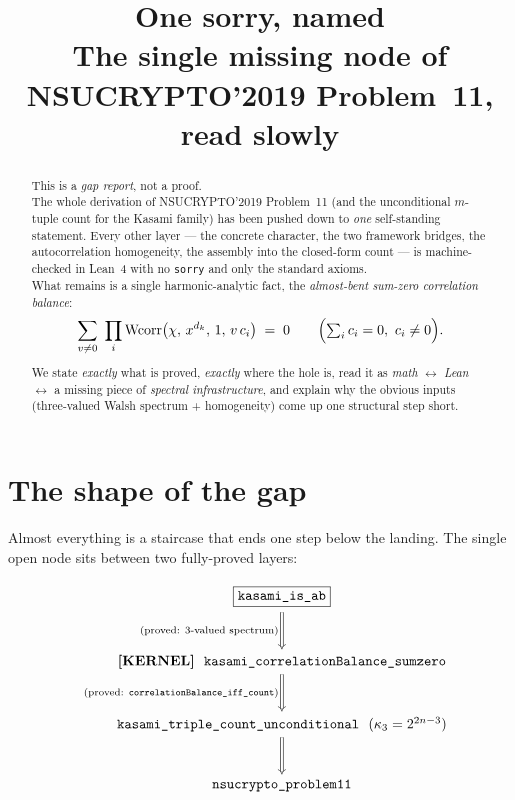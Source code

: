 \documentclass[11pt]{article}
\title{\textbf{One sorry, named}\\[4pt]
\large The single missing node of NSUCRYPTO'2019 Problem~11, read slowly}
\author{}
\date{}
\begin{document}
\maketitle

\begin{abstract}
\noindent
This is a \emph{gap report}, not a proof.\\[4pt]
The whole derivation of NSUCRYPTO'2019 Problem~11 (and the unconditional
$m$-tuple count for the Kasami family) has been pushed down to \emph{one}
self-standing statement.  Every other layer --- the concrete character, the
two framework bridges, the autocorrelation homogeneity, the assembly into the
closed-form count --- is machine-checked in Lean~4 with no \texttt{sorry} and
only the standard axioms.\\[6pt]
\noindent
What remains is a single harmonic-analytic fact, the
\emph{almost-bent sum-zero correlation balance}:
\[
  \sum_{v\neq 0}\ \prod_{i} \mathrm{Wcorr}\bigl(\chi,\, x^{d_k},\, 1,\, v\,c_i\bigr)
  \;=\; 0
  \qquad\Bigl(\textstyle\sum_i c_i = 0,\ c_i\neq 0\Bigr).
\]
\noindent
We state \emph{exactly} what is proved, \emph{exactly} where the hole is, read
it as \emph{math} $\leftrightarrow$ \emph{Lean} $\leftrightarrow$ a missing
piece of \emph{spectral infrastructure}, and explain why the obvious inputs
(three-valued Walsh spectrum + homogeneity) come up one structural step short.
\end{abstract}

\bigskip

\section*{The shape of the gap}

\noindent
Almost everything is a staircase that ends one step below the landing.
The single open node sits between two fully-proved layers:

\[
\begin{tikzcd}[row sep=large, column sep=small]
\boxed{\texttt{kasami\_is\_ab}}
  \arrow[d, Rightarrow, "\text{(proved: 3-valued spectrum)}"'] &[-2.2em] \\
\textbf{[KERNEL]}\ \ \texttt{kasami\_correlationBalance\_sumzero}
  \arrow[d, Rightarrow, "\text{(proved: }\texttt{correlationBalance\_iff\_count}\text{)}"'] \\
\texttt{kasami\_triple\_count\_unconditional}\ \ (\kappa_3 = 2^{2n-3})
  \arrow[d, Rightarrow] \\
\texttt{nsucrypto\_problem11}
\end{tikzcd}
\]
\end{document}
